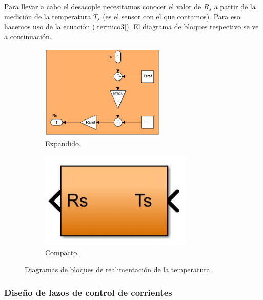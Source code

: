 \documentclass{article}
\begin{document}
Para llevar a cabo el desacople necesitamos conocer el valor de $R_s$ a partir de la medición de la 
temperatura $T_s$ (es el sensor con el que contamos). Para eso hacemos uso de la ecuación (\ref{termico3}).
El diagrama de bloques respectivo se ve a continuación.

\begin{figure}[H]
    \begin{subfigure}[b]{0.65\textwidth}
        \centering
        \includegraphics[width=0.65\textwidth]{realimentacion_temperatura.png}
        \caption{Expandido.}
    \end{subfigure}
    \begin{subfigure}[b]{0.24\textwidth}
        \centering
        \includegraphics[width=0.8\textwidth]{realimentacion_temperatura_compacto.jpg}
        \caption{Compacto.}
    \end{subfigure}
    \caption{Diagramas de bloques de realimentación de la temperatura.}
\end{figure}


\subsubsection{Diseño de lazos de control de corrientes}
\end{document}
